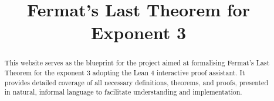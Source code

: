 \documentclass{report}
\title{Fermat's Last Theorem for Exponent 3}
\begin{document}
\maketitle
\begin{abstract}
    This website serves as the blueprint for the project aimed at formalising Fermat’s Last Theorem for
    the exponent 3 adopting the Lean 4 interactive proof assistant. It provides detailed coverage of
    all necessary definitions, theorems, and proofs, presented in natural, informal language to facilitate
    understanding and implementation.
\end{abstract}


\end{document}
